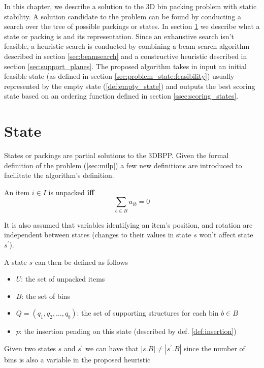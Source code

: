 In this chapter, we describe a solution to the 3D bin packing problem with static stability.
A solution candidate to the problem can be found by conducting a search over the tree of possible packings or states. In section \ref{sec:problem_state} we describe what a state or packing is and its representation.
Since an exhaustive search isn't feasible, a heuristic search is conducted by combining a beam search algorithm described in section \ref{sec:beamsearch} and a constructive heuristic described in section \ref{sec:support_planes}.
The proposed algorithm takes in input an initial feasible state (as defined in section \ref{sec:problem_state:feasibility}) usually represented by the empty state (\ref{def:empty_state}) and outputs the best scoring state based on an ordering function defined in section \ref{ssec:scoring_states}.

\section{State}
\label{sec:problem_state}%
States or packings are partial solutions to the 3DBPP. Given the formal definition of the problem (\ref{sec:milp}) a few new definitions are introduced to facilitate the algorithm's definition.
\begin{definition}
    An item $i \in I$ is unpacked \textbf{iff}
    \begin{equation*}
        \sum_{b \in B} u_{ib} = 0
    \end{equation*}
\end{definition}

It is also assumed that variables identifying an item's position, and rotation are independent between states (changes to their values in state $s$ won't affect state $s^\prime$).

A state $s$ can then be defined as follows
\begin{itemize}
    \item $U$: the set of unpacked items
    \item $B$: the set of bins
    \item $Q = (q_1, q_2,\dots, q_b)$: the set of supporting structures for each bin $b \in B$
    \item $p$: the insertion pending on this state (described by def. \ref{def:insertion})
\end{itemize}

\begin{observation}
    Given two states $s$ and $s^\prime$ we can have that $|s.B| \neq |s^\prime.B|$ since the number of bins is also a variable in the proposed heuristic
\end{observation}

